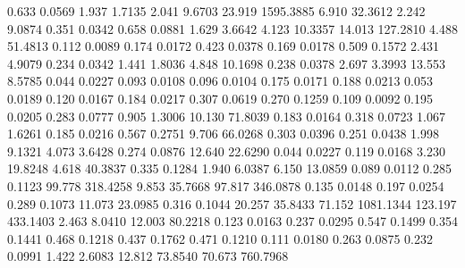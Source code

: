 0.633    0.0569     %
1.937    1.7135     %
2.041    9.6703     %
23.919   1595.3885  %
6.910    32.3612    %
2.242    9.0874     %
0.351    0.0342     %
0.658    0.0881     %
1.629    3.6642     %
4.123    10.3357    %
14.013   127.2810   %
4.488    51.4813    %
0.112    0.0089     %
0.174    0.0172     %
0.423    0.0378     %
0.169    0.0178     %
0.509    0.1572     %
2.431    4.9079     %
0.234    0.0342     %
1.441    1.8036     %
4.848    10.1698    %
0.238    0.0378     %
2.697    3.3993     %
13.553   8.5785     %
0.044    0.0227     %
0.093    0.0108     %
0.096    0.0104     %
0.175    0.0171     %
0.188    0.0213     %
0.053    0.0189     %
0.120    0.0167     %
0.184    0.0217     %
0.307    0.0619     %
0.270    0.1259     %
0.109    0.0092     %
0.195    0.0205     %
0.283    0.0777     %
0.905    1.3006     %
10.130   71.8039    %
0.183    0.0164     %
0.318    0.0723     %
1.067    1.6261     %
0.185    0.0216     %
0.567    0.2751     %
9.706    66.0268    %
0.303    0.0396     %
0.251    0.0438     %
1.998    9.1321     %
4.073    3.6428     %
0.274    0.0876     %
12.640   22.6290    %
0.044    0.0227     %
0.119    0.0168     %
3.230    19.8248    %
4.618    40.3837    %
0.335    0.1284     %
1.940    6.0387     %
6.150    13.0859    %
0.089    0.0112     %
0.285    0.1123     %
99.778   318.4258   %
9.853    35.7668    %
97.817   346.0878   %
0.135    0.0148     %
0.197    0.0254     %
0.289    0.1073     %
11.073   23.0985    %
0.316    0.1044     %
20.257   35.8433    %
71.152   1081.1344  %
123.197  433.1403   %
2.463    8.0410     %
12.003   80.2218    %
0.123    0.0163     %
0.237    0.0295     %
0.547    0.1499     %
0.354    0.1441     %
0.468    0.1218     %
0.437    0.1762     %
0.471    0.1210     %
0.111    0.0180     %
0.263    0.0875     %
0.232    0.0991     %
1.422    2.6083     %
12.812   73.8540    %
70.673   760.7968   %
